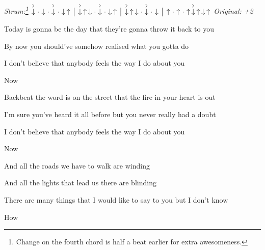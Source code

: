 \begin{song}


 \hfill
\textit{Strum:\footnote{Change on the fourth chord is half a beat earlier for extra awesomeness.}}
$\AccentDown\Miss\Down\Miss\AccentDown\Miss\Down\Up \Separator
\AccentDown\Up\Down\Miss\AccentDown\Miss\Down\Up \Separator
\AccentDown\Up\Down\Miss\AccentDown\Miss\Down \Separator \Up 
\Miss\Up\Miss\Up\AccentDown\Up\Down\Up
$ \hfill
\textit{Original: +2}

\large


\large

\bigskip

      \par

\bigskip

 Today is gonna be the day that they're gonna throw it back to you \par
{} By now you should've somehow realised what you gotta do  \par
{}I don't believe that anybody feels the way I do about you \par
{}Now   \par

\bigskip

 Backbeat the word is on the street that the fire in your heart is out \par
{} I'm sure you've heard it all before but you never really had a doubt \par
{}I don't believe that anybody feels the way I do about you \par
{}Now    \par

\bigskip

And all the roads we have to walk are winding \par
And all the lights that lead us there are blinding \par
{}There are many things that I would like to say to you but I don't know \par
{}How \par


\end{song}
